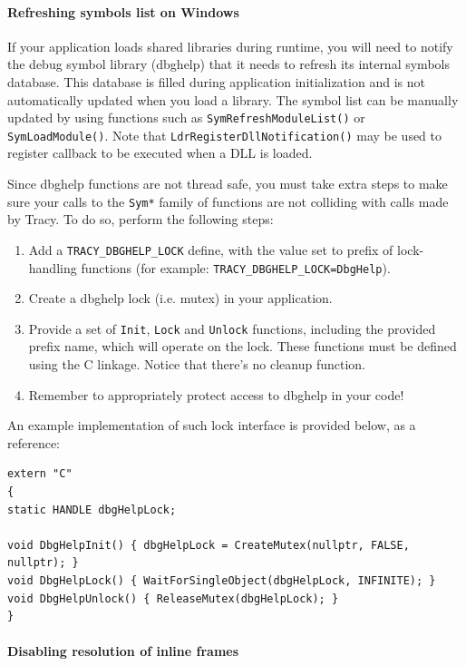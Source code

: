 \documentclass[hidelinks,titlepage,a4paper]{article}
\begin{document}
\paragraph{Refreshing symbols list on Windows}

If your application loads shared libraries during runtime, you will need to notify the debug symbol library (dbghelp) that it needs to refresh its internal symbols database. This database is filled during application initialization and is not automatically updated when you load a library. The symbol list can be manually updated by using functions such as \texttt{SymRefreshModuleList()} or \texttt{SymLoadModule()}. Note that \texttt{LdrRegisterDllNotification()} may be used to register callback to be executed when a DLL is loaded.

Since dbghelp functions are not thread safe, you must take extra steps to make sure your calls to the \texttt{Sym*} family of functions are not colliding with calls made by Tracy. To do so, perform the following steps:

\begin{enumerate}
\item Add a \texttt{TRACY\_DBGHELP\_LOCK} define, with the value set to prefix of lock-handling functions (for example: \texttt{TRACY\_DBGHELP\_LOCK=DbgHelp}).
\item Create a dbghelp lock (i.e. mutex) in your application.
\item Provide a set of \texttt{Init}, \texttt{Lock} and \texttt{Unlock} functions, including the provided prefix name, which will operate on the lock. These functions must be defined using the C linkage. Notice that there's no cleanup function.
\item Remember to appropriately protect access to dbghelp in your code!
\end{enumerate}

An example implementation of such lock interface is provided below, as a reference:

\begin{lstlisting}
extern "C"
{
static HANDLE dbgHelpLock;

void DbgHelpInit() { dbgHelpLock = CreateMutex(nullptr, FALSE, nullptr); }
void DbgHelpLock() { WaitForSingleObject(dbgHelpLock, INFINITE); }
void DbgHelpUnlock() { ReleaseMutex(dbgHelpLock); }
}
\end{lstlisting}

\paragraph{Disabling resolution of inline frames}
\end{document}
